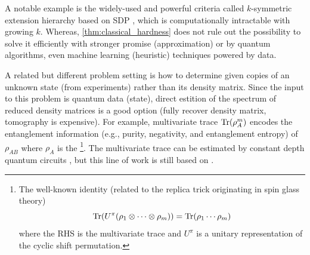 \documentclass[
reprint,
aps,
pra,
floatfix,
]{revtex4-2}
\theoremstyle{plain}
\theoremstyle{definition}
\newcommand{\dm}{\rho}
\newcommand{\U}{U}
\begin{document}
A notable example is the widely-used and powerful criteria called $k$-symmetric extension hierarchy based on SDP \cite{navascuesPowerSymmetricExtensions2009}, 
which is computationally intractable with growing $k$.
Whereas, \cref{thm:classical_hardness} does not rule out the possibility to solve it efficiently with stronger promise (approximation) or by quantum algorithms, even machine learning (heuristic) techniques powered by data.


A related but different problem setting is how to determine  given copies of an unknown state (from experiments) rather than its density matrix.
Since the input to this problem is quantum data (state), direct estition of the spectrum of reduced density matrices is a good option (fully recover density matrix, tomography is expensive).
For example, multivariate trace $\Tr(\dm_A^m)$ encodes the entanglement information (e.g., purity, negativity, and entanglement entropy) of $\dm_{AB}$ where $\dm_A$ is the 
 \cite{ekertDirectEstimationsLinear2002} \cite{horodeckiDirectDetectionQuantum2002}
\footnote{
	The well-known identity (related to the replica trick originating in spin glass theory)
	\begin{equation}
		\Tr(\U^{\pi} (\dm_1 \otimes \cdots \otimes \dm_m) ) = 
		\Tr(\dm_1\cdots \dm_m)
	\end{equation}
	where the RHS is the multivariate trace and $\U^{\pi}$ is a unitary representation of the cyclic shift permutation.
}.
The multivariate trace can be estimated by constant depth quantum circuits \cite{johriEntanglementSpectroscopyQuantum2017}  \cite{quekMultivariateTraceEstimation2022}, but this line of work is still based on .
\end{document}
